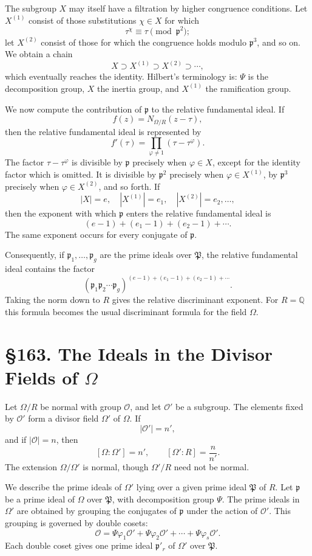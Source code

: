 \documentclass[11pt,a4paper]{book}
\newcommand{\webersection}[2]{\clearpage\section*{\S #1. #2}}
\newcommand{\Pgr}{\mathfrak P}
\newcommand{\p}{\mathfrak p}
\begin{document}
The subgroup \(X\) may itself have a filtration by higher congruence conditions.  Let \(X^{(1)}\) consist of those substitutions \(\chi\in X\) for which
\[
  \tau^\chi\equiv \tau\pmod{\p^2};
\]
let \(X^{(2)}\) consist of those for which the congruence holds modulo \(\p^3\), and so on.  We obtain a chain
\[
  X\supset X^{(1)}\supset X^{(2)}\supset\cdots,
\tag{4}
\]
which eventually reaches the identity.  Hilbert's terminology is: \(\Psi\) is the decomposition group, \(X\) the inertia group, and \(X^{(1)}\) the ramification group.

We now compute the contribution of \(\p\) to the relative fundamental ideal.  If
\[
  f(z)=N_{\Omega/R}(z-\tau),
\]
then the relative fundamental ideal is represented by
\[
  f'(\tau)=\prod_{\varphi\ne1}(\tau-\tau^\varphi).
\tag{5}
\]
The factor \(\tau-\tau^\varphi\) is divisible by \(\p\) precisely when \(\varphi\in X\), except for the identity factor which is omitted.  It is divisible by \(\p^2\) precisely when \(\varphi\in X^{(1)}\), by \(\p^3\) precisely when \(\varphi\in X^{(2)}\), and so forth.  If
\[
  |X|=e,\quad |X^{(1)}|=e_1,\quad |X^{(2)}|=e_2,\ldots,
\]
then the exponent with which \(\p\) enters the relative fundamental ideal is
\[
  (e-1)+(e_1-1)+(e_2-1)+\cdots.
\tag{6}
\]
The same exponent occurs for every conjugate of \(\p\).

Consequently, if \(\p_1,\ldots,\p_g\) are the prime ideals over \(\Pgr\), the relative fundamental ideal contains the factor
\[
  (\p_1\p_2\cdots\p_g)^{(e-1)+(e_1-1)+(e_2-1)+\cdots}.
\tag{7}
\]
Taking the norm down to \(R\) gives the relative discriminant exponent.  For \(R=\mathbb Q\) this formula becomes the usual discriminant formula for the field \(\Omega\).

\webersection{163}{The Ideals in the Divisor Fields of \(\Omega\)}

Let \(\Omega/R\) be normal with group \(\mathcal O\), and let \(\mathcal O'\) be a subgroup.  The elements fixed by \(\mathcal O'\) form a divisor field \(\Omega'\) of \(\Omega\).  If
\[
  |\mathcal O'|=n',
\]
and if \(|\mathcal O|=n\), then
\[
  [\Omega:\Omega']=n',\qquad [\Omega':R]=\frac n{n'}.
\]
The extension \(\Omega/\Omega'\) is normal, though \(\Omega'/R\) need not be normal.

We describe the prime ideals of \(\Omega'\) lying over a given prime ideal \(\Pgr\) of \(R\).  Let \(\p\) be a prime ideal of \(\Omega\) over \(\Pgr\), with decomposition group \(\Psi\).  The prime ideals in \(\Omega'\) are obtained by grouping the conjugates of \(\p\) under the action of \(\mathcal O'\).  This grouping is governed by double cosets:
\[
  \mathcal O
     =\Psi\varphi_1\mathcal O'
      +\Psi\varphi_2\mathcal O'
      +\cdots+
       \Psi\varphi_s\mathcal O'.
\tag{1}
\]
Each double coset gives one prime ideal \(\p'_r\) of \(\Omega'\) over \(\Pgr\).
\end{document}
